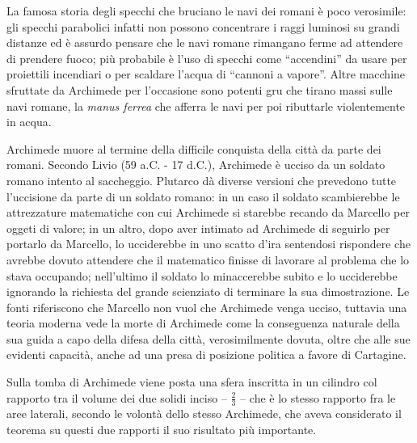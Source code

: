 \par La famosa storia degli specchi che bruciano le navi dei romani \`e poco verosimile: gli specchi parabolici infatti non possono concentrare i raggi luminosi su grandi distanze ed \`e assurdo pensare che le navi romane rimangano ferme ad attendere di prendere fuoco; pi\`u probabile \`e l'uso di specchi come ``accendini'' da usare per proiettili incendiari o per scaldare l'acqua di ``cannoni a vapore''. Altre macchine sfruttate da Archimede per l'occasione sono potenti gru che tirano massi sulle navi romane, la \textit{manus ferrea} che afferra le navi per poi ributtarle violentemente in acqua.
\par Archimede muore al termine della difficile conquista della citt\`a da parte dei romani. Secondo Livio (59 a.C. - 17 d.C.), Archimede \`e ucciso da un soldato romano intento al saccheggio. Plutarco d\`a diverse versioni che prevedono tutte l'uccisione da parte di un soldato romano: in un caso il soldato scambierebbe le attrezzature matematiche con cui Archimede si starebbe recando da Marcello per oggeti di valore; in un altro, dopo aver intimato ad Archimede di seguirlo per portarlo da Marcello, lo ucciderebbe in uno scatto d'ira sentendosi rispondere che avrebbe dovuto attendere che il matematico finisse di lavorare al problema che lo stava occupando; nell'ultimo il soldato lo minaccerebbe subito e lo ucciderebbe ignorando la richiesta del grande scienziato di terminare la sua dimostrazione. Le fonti riferiscono che Marcello non vuol che Archimede venga ucciso, tuttavia una teoria moderna vede la morte di Archimede come la conseguenza naturale della sua guida a capo della difesa della citt\`a, verosimilmente dovuta, oltre che alle sue evidenti capacit\`a, anche ad una presa di posizione politica a favore di Cartagine.
\par Sulla tomba di Archimede viene posta una sfera inscritta in un cilindro col rapporto tra il volume dei due solidi inciso -- $\frac{2}{3}$ -- che \`e lo stesso rapporto fra le aree laterali, secondo le volont\`a dello stesso Archimede, che aveva considerato il teorema su questi due rapporti il suo risultato pi\`u importante.
